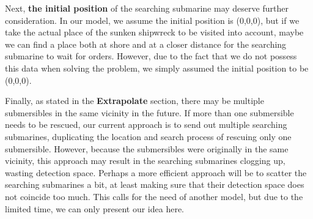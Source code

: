 \documentclass[12pt]{article}
\begin{document}
Next, \textbf{the initial position} of the searching submarine may deserve further consideration. In our model, we assume the initial position is (0,0,0), but if we take the actual place of the sunken shipwreck to be visited into account, maybe we can find a place both at shore and at a closer distance for the searching submarine to wait for orders. However, due to the fact that we do not possess this data when solving the problem, we simply assumed the initial position to be (0,0,0).

Finally, as stated in the \textbf{Extrapolate} section, there may be multiple submersibles in the same vicinity in the future. If more than one submersible needs to be rescued, our current approach is to send out multiple searching submarines, duplicating the location and search process of rescuing only one submersible. However, because the submersibles were originally in the same vicinity, this approach may result in the searching submarines clogging up, wasting detection space. Perhaps a more efficient approach will be to scatter the searching submarines a bit, at least making sure that their detection space does not coincide too much. This calls for the need of another model, but due to the limited time, we can only present our idea here.
\clearpage   %
\end{document}
